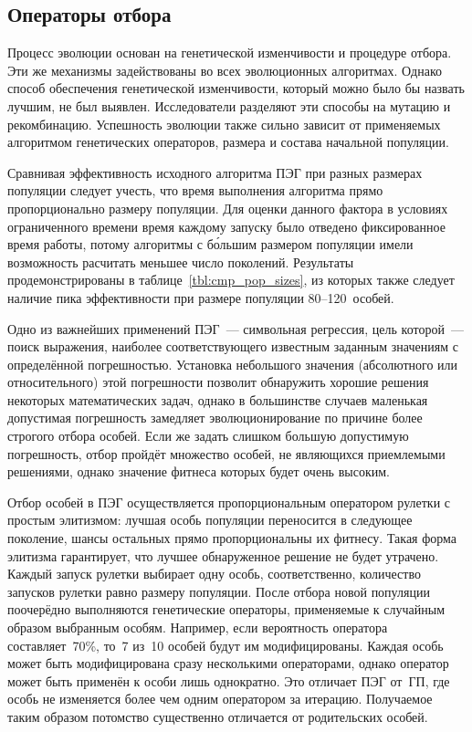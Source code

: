 


\subsection{Операторы отбора}

Процесс эволюции основан на генетической изменчивости и процедуре отбора. Эти же механизмы задействованы во всех эволюционных алгоритмах. Однако способ обеспечения генетической изменчивости, который можно было бы назвать лучшим, не был выявлен. Исследователи разделяют эти способы на мутацию и рекомбинацию. Успешность эволюции также сильно зависит от применяемых алгоритмом генетических операторов, размера и состава начальной популяции.

Сравнивая эффективность исходного алгоритма ПЭГ при разных размерах популяции следует учесть, что время выполнения алгоритма прямо пропорционально размеру популяции. Для оценки данного фактора в условиях ограниченного времени время каждому запуску было отведено фиксированное время работы, потому алгоритмы с б\'{о}льшим размером популяции имели возможность расчитать меньшее число поколений. Результаты продемонстрированы в таблице~\ref{tbl:cmp_pop_sizes}, из которых также следует наличие пика эффективности при размере популяции 80--120~особей.



Одно из важнейших применений ПЭГ~--- символьная регрессия, цель которой~--- поиск выражения, наиболее соответствующего известным заданным значениям с определённой погрешностью. Установка небольшого значения (абсолютного или относительного) этой погрешности позволит обнаружить хорошие решения некоторых математических задач, однако в большинстве случаев маленькая допустимая погрешность замедляет эволюционирование по причине более строгого отбора особей. Если же задать слишком большую допустимую погрешность, отбор пройдёт множество особей, не являющихся приемлемыми решениями, однако значение фитнеса которых будет очень высоким.

Отбор особей в ПЭГ осуществляется пропорциональным оператором рулетки с простым элитизмом: лучшая особь популяции переносится в следующее поколение, шансы остальных прямо пропорциональны их фитнесу. Такая форма элитизма гарантирует, что лучшее обнаруженное решение не будет утрачено. Каждый запуск рулетки выбирает одну особь, соответственно, количество запусков рулетки равно размеру популяции.
После отбора новой популяции поочерёдно выполняются генетические операторы, применяемые к случайным образом выбранным особям. Например, если вероятность оператора составляет~70\%, то~7 из~10 особей будут им модифицированы. Каждая особь может быть модифицирована сразу несколькими операторами, однако оператор может быть применён к особи лишь однократно. Это отличает ПЭГ от~ГП, где особь не изменяется более чем одним оператором за итерацию. Получаемое таким образом потомство существенно отличается от родительских особей.

